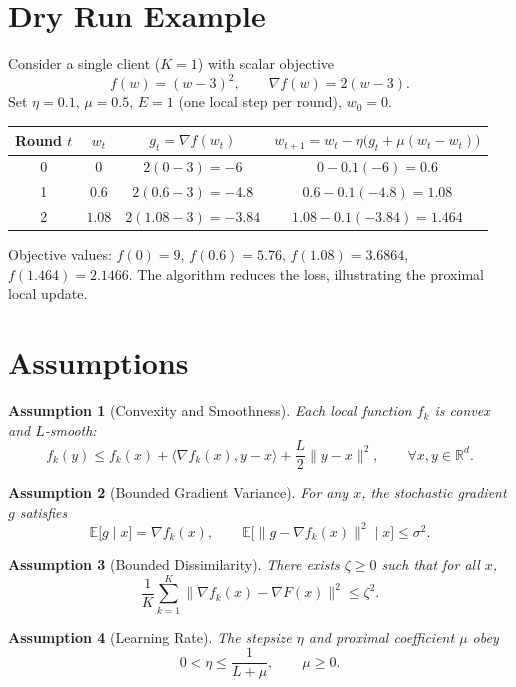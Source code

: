 \documentclass{article}
\newtheorem{assumption}{Assumption}
\newcommand{\EE}{\mathbb{E}}
\newcommand{\prox}{\mu}
\begin{document}
\section*{Dry Run Example}
Consider a single client ($K=1$) with scalar objective
\[
f(w)=(w-3)^2,
\qquad \nabla f(w)=2(w-3).
\]
Set $\eta=0.1$, $\prox=0.5$, $E=1$ (one local step per round), $w_0=0$.

\begin{center}
\begin{tabular}{c|c|c|c}
Round $t$ & $w_t$ & $g_t=\nabla f(w_t)$ & $w_{t+1}=w_t-\eta\bigl(g_t+\prox(w_t-w_t)\bigr)$ \\ \hline
0 & $0$ & $2(0-3)=-6$ & $0-0.1(-6)=0.6$ \\
1 & $0.6$ & $2(0.6-3)=-4.8$ & $0.6-0.1(-4.8)=1.08$ \\
2 & $1.08$ & $2(1.08-3)=-3.84$ & $1.08-0.1(-3.84)=1.464$ \\
\end{tabular}
\end{center}
Objective values: $f(0)=9$, $f(0.6)=5.76$, $f(1.08)=3.6864$, $f(1.464)=2.1466$.
The algorithm reduces the loss, illustrating the proximal local update.

\newpage
\section*{Assumptions}
\begin{assumption}[Convexity and Smoothness]\label{ass:convex}
Each local function $f_k$ is convex and $L$‑smooth:
\[
f_k(y)\le f_k(x)+\langle\nabla f_k(x),y-x\rangle+\frac{L}{2}\|y-x\|^2,
\qquad\forall x,y\in\mathbb{R}^d.
\]
\end{assumption}
\begin{assumption}[Bounded Gradient Variance]\label{ass:variance}
For any $x$, the stochastic gradient $g$ satisfies
\[
\EE\!\bigl[g\mid x\bigr]=\nabla f_k(x),\qquad
\EE\!\bigl[\|g-\nabla f_k(x)\|^2\mid x\bigr]\le\sigma^2 .
\]
\end{assumption}
\begin{assumption}[Bounded Dissimilarity]\label{ass:dissim}
There exists $\zeta\ge0$ such that for all $x$,
\[
\frac{1}{K}\sum_{k=1}^{K}\|\nabla f_k(x)-\nabla F(x)\|^2\le \zeta^2 .
\]
\end{assumption}
\begin{assumption}[Learning Rate]\label{ass:lr}
The stepsize $\eta$ and proximal coefficient $\prox$ obey
\[
0<\eta\le \frac{1}{L+\prox},\qquad \prox\ge0.
\]
\end{assumption}
\end{document}
